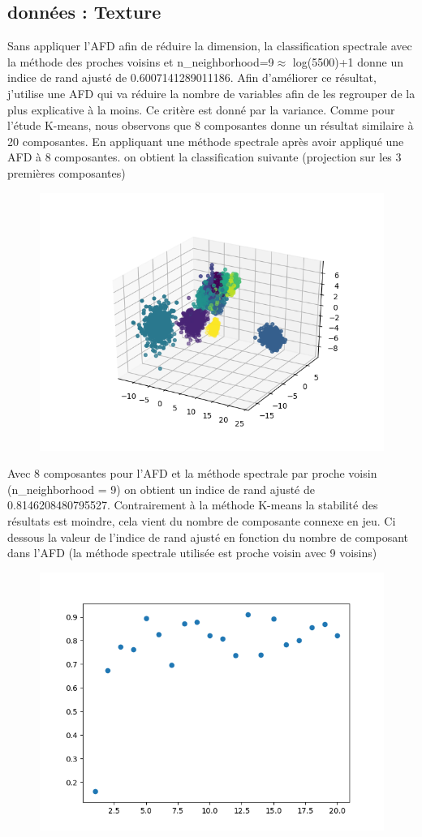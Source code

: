 \documentclass[12pt]{scrartcl} %
\begin{document}
\subsection{données : Texture}
Sans appliquer l'AFD afin de réduire la dimension, la classification spectrale avec la méthode des proches voisins et n\_neighborhood=9$\approx$ log(5500)+1 donne un indice de rand ajusté de 0.6007141289011186. Afin d'améliorer ce résultat, j'utilise une AFD qui va réduire la nombre de variables afin de les regrouper de la plus explicative à la moins. Ce critère est donné par la variance. Comme pour l'étude K-means, nous observons que 8 composantes donne un résultat similaire à 20 composantes. En appliquant une méthode spectrale après avoir appliqué une AFD à 8 composantes. on obtient la classification suivante (projection sur les 3 premières composantes)
\newline
\begin{figure}[!h]
 \centering 
\includegraphics[scale=.5]{spectraleAFD.png}
\end{figure}
\newline 
Avec 8 composantes pour l'AFD et la méthode spectrale par proche voisin (n\_neighborhood = 9) on obtient un indice de rand ajusté de 0.8146208480795527. Contrairement à la méthode K-means la stabilité des résultats est moindre, cela vient du nombre de composante connexe en jeu. Ci dessous la valeur de l'indice de rand ajusté en fonction du nombre de composant dans l'AFD (la méthode spectrale utilisée est proche voisin avec 9 voisins)
\newline
\begin{figure}[!h]
 \centering 
\includegraphics[scale=.3]{metricsAFDNN.png}
\end{figure}
\newline 
\end{document}
